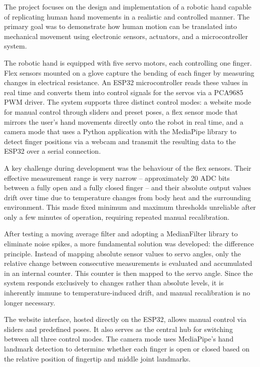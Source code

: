 \documentclass[12pt,a4paper]{article}
\begin{document}
The project focuses on the design and implementation of a robotic hand capable of replicating human hand movements in a realistic and controlled manner. The primary goal was to demonstrate how human motion can be translated into mechanical movement using electronic sensors, actuators, and a microcontroller system.

The robotic hand is equipped with five servo motors, each controlling one finger. Flex sensors mounted on a glove capture the bending of each finger by measuring changes in electrical resistance. An ESP32 microcontroller reads these values in real time and converts them into control signals for the servos via a PCA9685 PWM driver. The system supports three distinct control modes: a website mode for manual control through sliders and preset poses, a flex sensor mode that mirrors the user's hand movements directly onto the robot in real time, and a camera mode that uses a Python application with the MediaPipe library to detect finger positions via a webcam and transmit the resulting data to the ESP32 over a serial connection.

A key challenge during development was the behaviour of the flex sensors. Their effective measurement range is very narrow -- approximately 20 ADC bits between a fully open and a fully closed finger -- and their absolute output values drift over time due to temperature changes from body heat and the surrounding environment. This made fixed minimum and maximum thresholds unreliable after only a few minutes of operation, requiring repeated manual recalibration.

After testing a moving average filter and adopting a MedianFilter library to eliminate noise spikes, a more fundamental solution was developed: the difference principle. Instead of mapping absolute sensor values to servo angles, only the relative change between consecutive measurements is evaluated and accumulated in an internal counter. This counter is then mapped to the servo angle. Since the system responds exclusively to changes rather than absolute levels, it is inherently immune to temperature-induced drift, and manual recalibration is no longer necessary.

The website interface, hosted directly on the ESP32, allows manual control via sliders and predefined poses. It also serves as the central hub for switching between all three control modes. The camera mode uses MediaPipe's hand landmark detection to determine whether each finger is open or closed based on the relative position of fingertip and middle joint landmarks.
\end{document}
